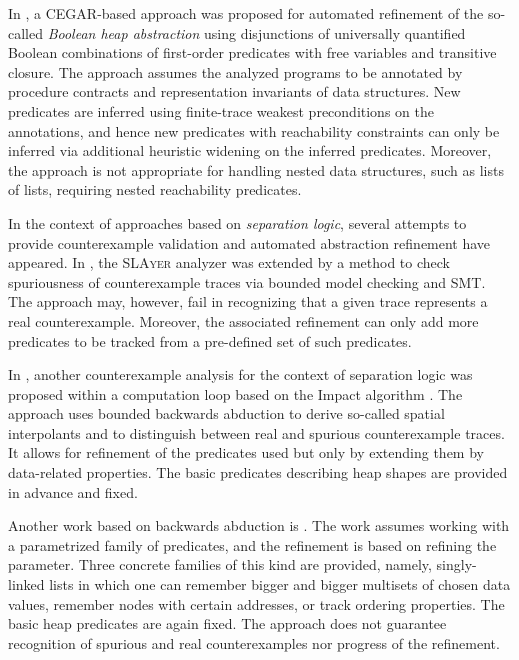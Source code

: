 	  In \cite{podelski:popl10}, a CEGAR-based approach was proposed for automated
	  refinement of the so-called \emph{Boolean heap abstraction} using disjunctions
	  of universally quantified Boolean combinations of first-order predicates with
	  free variables and transitive closure.
	  The approach assumes the analyzed programs to be annotated by
	  procedure contracts and representation invariants of data structures. New
	  predicates are inferred using finite-trace weakest preconditions on the
	  annotations, and hence new predicates with reachability constraints can only be
	  inferred via additional heuristic widening on the inferred predicates. Moreover,
	  the approach is not appropriate for handling nested data structures, such as
	  lists of lists, requiring nested reachability predicates.

	  In the context of approaches based on \emph{separation logic}, several attempts
	  to provide counterexample validation and automated abstraction refinement have
	  appeared. In \cite{slayer12}, the \textsc{SLAyer} analyzer was extended by a method to
	  check spuriousness of counterexample traces via bounded model checking and SMT.
	  The approach may, however, fail in recognizing that a given
	  trace represents a real counterexample. Moreover, the associated refinement can
	  only add more predicates to be tracked from a pre-defined set of such
	  predicates.
	  
	  In \cite{splinter15}, another counterexample analysis for the
	  context of separation logic was proposed within a computation loop based on the
	  Impact algorithm \cite{impact06}. The approach uses bounded backwards abduction
	  to derive so-called spatial interpolants and to distinguish between real and
	  spurious counterexample traces. It allows for refinement of the predicates used
	  but only by extending them by data-related properties. The basic predicates
	  describing heap shapes are provided in advance and fixed.
	  
	  Another work based on backwards abduction is \cite{botincan15}. The work assumes working with a
	  parametrized family of predicates, and the refinement is based on refining the
	  parameter. Three concrete families of this kind are provided, namely,
	  singly-linked lists in which one can remember bigger and bigger multisets of
	  chosen data values, remember nodes with certain addresses, or track ordering
	  properties. The basic heap predicates are again fixed. The approach does not
	  guarantee recognition of spurious and real counterexamples nor progress of the
	  refinement.

